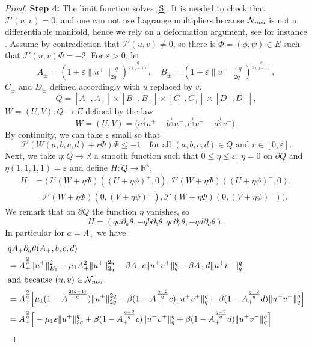 \documentclass[10pt,a4paper]{amsart}
\numberwithin{equation}{section}
\begin{document}
\begin{proof}
\noindent\textbf{Step 4:} The limit function solves \eqref{S}.
It is needed to check that $\mathcal I'(u,v)=0$, and
one can not use Lagrange multipliers because $\mathcal N_{\rm nod}$ is not a
differentiable manifold, hence we rely on a deformation argument, see for instance
\cite{CTV_AIHP}.
Assume by contradiction that $\mathcal I'(u,v)\neq 0$, so there is
$\Phi=(\phi, \psi)\in E$ such that $\mathcal I'(u,v) \Phi = -2$.
For $\varepsilon>0$, let
\[
A_{\pm}=\left(1\pm\varepsilon\|u^+\|_{2q}^{-q}\right)^{\frac{q}{2(q-1)}}, \quad
B_{\pm}=\left(1\pm\varepsilon\|u^-\|_{2q}^{-q}\right)^{\frac{q}{2(q-1)}},
\]
$C_{\pm}$ and $D_{\pm}$ defined accordingly with $u$ replaced by $v$,
\[
Q = [A_-,A_+]\times[B_-,B_+]\times[C_-,C_+]\times[D_-,D_+],
\]
$W=(U,V):Q\to E$ defined by the law
\[
W=(U,V)=\Big( a^{\frac{1}q}u^+ - b^{\frac{1}{q}}u^-, c^{\frac{1}q}v^+
- d^{\frac{1}q}v^-\Big) .
\]
By continuity, we can take $\varepsilon$ small so that
\begin{equation}\label{I<-1}
 \mathcal I'(W(a,b,c,d)+r\Phi) \Phi \le -1 \quad
  \text{for all } (a,b,c,d)\in Q \text{ and } r\in [0,\varepsilon].
\end{equation}
Next, we take $\eta:Q\to \mathbb{R}$ a smooth function such that $0\le \eta\le \varepsilon$,
$\eta=0$ on $\partial Q$ and $\eta(1,1,1,1)=\varepsilon$
and define $H : Q \to \mathbb{R}^4$,
\begin{align*}
H&=\Big( \mathcal I'(W+\eta\Phi) ((U+\eta\phi)^+,0),
 \mathcal I'(W+\eta\Phi) ((U+\eta\phi)^-,0),  \\
&\quad  \mathcal I'(W+\eta\Phi) (0,(V+\eta\psi)^+), \mathcal I'(W+\eta\Phi) (0,(V+\eta\psi)^-)
 \Big) .
\end{align*}
We remark that on $\partial Q$ the function $\eta$ vanishes, so
\[
H=\left(qa \partial_a\theta, -qb\partial_b\theta, qc\partial_c\theta,
-qd\partial_d\theta\right) .
\]
In particular for $a=A_+$ we have
\begin{align*}
&q A_+ \partial_a\theta(A_+,b,c,d) \\
&= A_+^{\frac{2}q}\|u^+\|_{E_1}^{2}-\mu_1A_+^2\|u^+\|_{2q}^{2q} -\beta A_+c\|u^+v^+\|_q^q
-\beta A_+d\|u^+v^-\|_q^q\\
 \intertext{and because $(u,v)\in \mathcal N_{\rm nod}$}
&= A_+^{\frac{2}q}\Big[ \mu_1(1-A_+^{\frac{2(q-1)}q}) \|u^+\|_{2q}^{2q}
 -\beta (1-A_+^{\frac{q-2}q}c) \|u^+v^+\|_q^q -\beta (1-A_+^{\frac{q-2}q}d)\|u^+v^-
  \|_q^q\Big] \\
&=A_+^{\frac{2}q}\Big[ -\mu_1 \varepsilon \|u^+\|_{2q}^{q} +\beta (1-A_+^{\frac{q-2}q}c)
 \|u^+v^+\|_q^q +\beta (1-A_+^{\frac{q-2}q}d)\|u^+v^-\|_q^q\Big]

\end{align*}
\end{proof}
\end{document}
